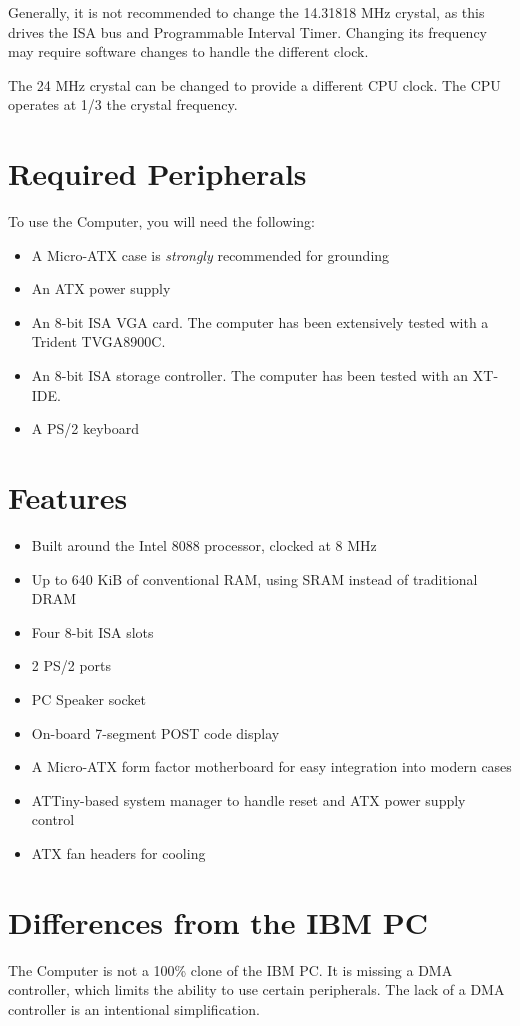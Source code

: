 \documentclass[twoside,10pt,letterpaper]{refart}
\begin{document}
Generally, it is not recommended to change the 14.31818 MHz crystal, as this drives the
ISA bus and Programmable Interval Timer. Changing its frequency may require software changes
to handle the different clock.

The 24 MHz crystal can be changed to provide a different CPU clock. The CPU operates at
1/3 the crystal frequency.

\section{Required Peripherals}
To use the  Computer, you will need the following:
\begin{itemize}
    \item A Micro-ATX case is \emph{strongly} recommended for grounding
    \item An ATX power supply
    \item An 8-bit ISA VGA card. The computer has been extensively tested with a Trident TVGA8900C.
    \item An 8-bit ISA storage controller. The computer has been tested with an XT-IDE.
    \item A PS/2 keyboard
\end{itemize}

\section{Features}
\begin{itemize}
    \item Built around the Intel 8088 processor, clocked at 8 MHz
    \item Up to 640 KiB of conventional RAM, using SRAM instead of traditional DRAM
    \item Four 8-bit ISA slots
    \item 2 PS/2 ports
    \item PC Speaker socket
    \item On-board 7-segment POST code display
    \item A Micro-ATX form factor motherboard for easy integration into modern cases
    \item ATTiny-based system manager to handle reset and ATX power supply control
    \item ATX fan headers for cooling
\end{itemize}

\section{Differences from the IBM PC}
The  Computer is not a 100\% clone of the IBM PC. It is missing a
DMA controller, which limits the ability to use certain peripherals. The lack of a
DMA controller is an intentional simplification.
\end{document}
